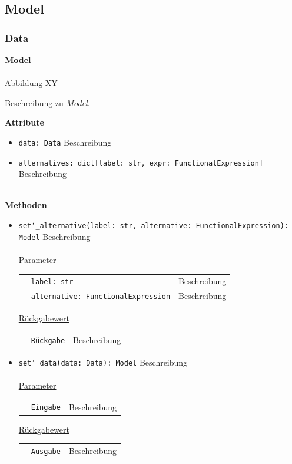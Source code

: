 \documentclass{article}
\begin{document}
\subsection{Model}
\subsubsection{Data}
\textbf{\large{Model}}\\\\
Abbildung XY

Beschreibung zu \textit{Model}.
\newline \newline

\textbf{{Attribute}}
\begin{itemize}
\item \texttt{data: Data} \newline Beschreibung
\item \texttt{alternatives: dict[label: str, expr: FunctionalExpression]} \newline Beschreibung
\\\\
\end{itemize}

\textbf{{Methoden}}
\begin{itemize}
\item \texttt{set\char`_alternative(label: str, alternative: FunctionalExpression): Model} \newline Beschreibung
\\\\
\underline{{Parameter}}

\begin{tabular}{lll}
 & \texttt{label: str} & Beschreibung \\
 & \texttt{alternative: FunctionalExpression} & Beschreibung \\
\end{tabular}

\underline{{Rückgabewert}}

\begin{tabular}{lll}
 & \texttt{Rückgabe} & Beschreibung \\
\end{tabular}

\item \texttt{set\char`_data(data: Data): Model} \newline Beschreibung
\\\\
\underline{{Parameter}}
\begin{tabular}{lll}
 & \texttt{Eingabe} & Beschreibung \\
\end{tabular}

\underline{{Rückgabewert}}
\begin{tabular}{lll}
 & \texttt{Ausgabe} & Beschreibung \\
\end{tabular}
\end{itemize}
\end{document}
